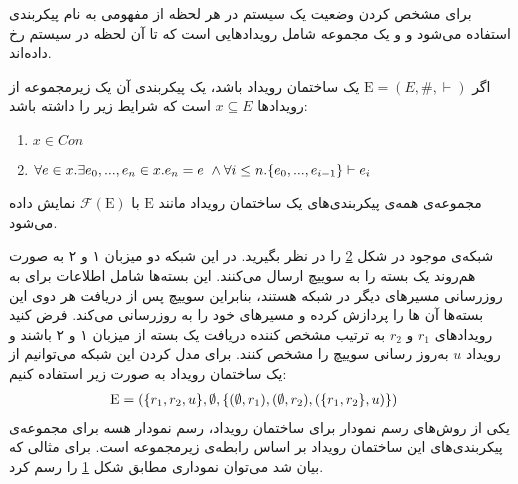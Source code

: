 برای مشخص کردن وضعیت یک سیستم در هر لحظه از مفهومی به نام پیکر‌بندی%
استفاده می‌شود و
و یک مجموعه شامل رویدادهایی است که تا آن لحظه در سیستم رخ داده‌اند.
\begin{definition}
    \label{def:configuration}
    اگر
    $\mathrm{E} = (E,\#,\vdash)$
    یک ساختمان رویداد باشد، یک پیکربندی آن یک زیرمجموعه از رویداد‌ها
    $x \subseteq E$
    است که شرایط زیر را داشته باشد:
    \begin{enumerate}
        \item $x \in Con$
        \item $\forall e \in x. \exists e_0,...,e_n \in x. e_n = e \ \wedge
                  \forall i \leq n. \{e_0,...,e_{i-1}\} \vdash e_i$
    \end{enumerate}
\end{definition}
مجموعه‌ی همه‌ی پیکربندی‌های یک ساختمان رویداد مانند
$\mathrm{E}$
با
$\mathcal{F}(\mathrm{E})$
نمایش داده می‌شود.

شبکه‌ی موجود در شکل
\ref{fig:es:update}
را در نظر بگیرید.
در این شبکه دو میزبان ۱ و ۲ به صورت هم‌روند یک بسته را به سوییچ ارسال می‌کنند.
این بسته‌ها شامل اطلاعات برای به روزرسانی مسیر‌های دیگر در شبکه هستند، بنابراین سوییچ پس از دریافت هر دوی این بسته‌ها آن ها را پردازش کرده و مسیر‌های خود را به روزرسانی می‌کند.
فرض کنید رویدادهای 
$r_1$
و
$r_2$
به ترتیب مشخص کننده‌ دریافت یک بسته از میزبان ۱ و ۲ باشند و 
رویداد 
$u$
به‌روز رسانی سوییچ را مشخص کنند.
برای مدل کردن این شبکه می‌توانیم از یک ساختمان رویداد به صورت زیر استفاده کنیم:
\begin{align*}
    \mathrm{E} & = (
    \{r_1,r_2,u\},
    \emptyset, \{(\emptyset,r_1),(\emptyset,r_2),(\{r_1,r_2\},u)\}
    )
\end{align*}
یکی از روش‌های رسم نمودار برای ساختمان رویداد، رسم نمودار هسه%
برای مجموعه‌ی پیکربندی‌های این ساختمان رویداد بر اساس رابطه‌ی زیرمجموعه است.
برای مثالی که بیان شد می‌توان نموداری مطابق شکل
\ref{fig:es:configs}
را رسم کرد.
\begin{figure}
    \centering
    \caption{}
    \label{fig:es:configs}
\end{figure}

\begin{figure}
    \centering
    \caption{}
    \label{fig:es:update}
\end{figure}